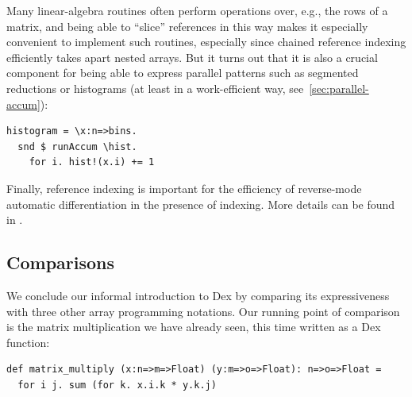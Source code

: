 \documentclass[acmsmall,screen,nonacm]{acmart}
\newlength{\codeindent}
\begin{document}
Many linear-algebra routines often perform operations over, e.g., the rows of a matrix, and being able to ``slice'' references in this way makes it especially convenient to implement such routines, especially since chained reference indexing efficiently takes apart nested arrays.
But it turns out that it is also a crucial component for being able to express parallel patterns such as segmented reductions or histograms (at least in a work-efficient way, see~\ref{sec:parallel-accum}):
\begin{Verbatim}[xleftmargin=\codeindent,fontsize=\small]
histogram = \x:n=>bins.
  snd $ runAccum \hist.
    for i. hist!(x.i) += 1
\end{Verbatim}
Finally, reference indexing is important for the efficiency of reverse-mode automatic differentiation in the presence of indexing. More details can be found in .


\subsection{Comparisons}
\label{sec:expressiveness-comparisons}

We conclude our informal introduction to Dex by comparing its expressiveness with three other array programming notations.
Our running point of comparison is the matrix multiplication we have already seen, this time written as a Dex function:
\begin{Verbatim}[xleftmargin=\codeindent,fontsize=\small]
def matrix_multiply (x:n=>m=>Float) (y:m=>o=>Float): n=>o=>Float =
  for i j. sum (for k. x.i.k * y.k.j)
\end{Verbatim}
\end{document}
